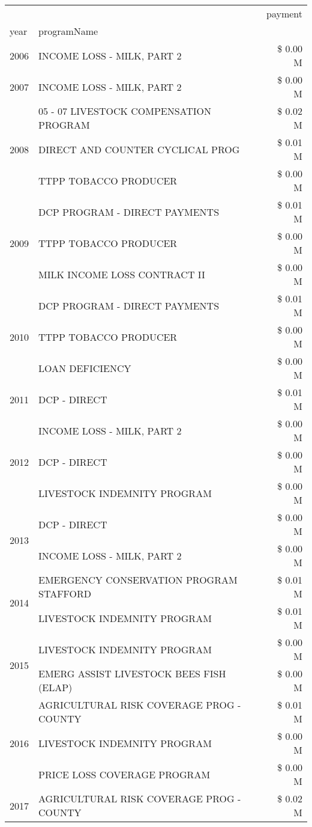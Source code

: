\begin{tabular}{llr}
\toprule
 &  & payment \\
year & programName &  \\
\midrule
2006 & INCOME LOSS - MILK, PART 2 & \$ 0.00 M \\
\cline{1-3}
2007 & INCOME LOSS - MILK, PART 2 & \$ 0.00 M \\
\cline{1-3}
\multirow[t]{3}{*}{2008} & 05 - 07 LIVESTOCK COMPENSATION PROGRAM & \$ 0.02 M \\
 & DIRECT AND COUNTER CYCLICAL PROG & \$ 0.01 M \\
 & TTPP TOBACCO PRODUCER & \$ 0.00 M \\
\cline{1-3}
\multirow[t]{3}{*}{2009} & DCP PROGRAM - DIRECT PAYMENTS & \$ 0.01 M \\
 & TTPP TOBACCO PRODUCER & \$ 0.00 M \\
 & MILK INCOME LOSS CONTRACT II & \$ 0.00 M \\
\cline{1-3}
\multirow[t]{3}{*}{2010} & DCP PROGRAM - DIRECT PAYMENTS & \$ 0.01 M \\
 & TTPP TOBACCO PRODUCER & \$ 0.00 M \\
 & LOAN DEFICIENCY & \$ 0.00 M \\
\cline{1-3}
2011 & DCP - DIRECT & \$ 0.01 M \\
\cline{1-3}
\multirow[t]{3}{*}{2012} & INCOME LOSS - MILK, PART 2 & \$ 0.00 M \\
 & DCP - DIRECT & \$ 0.00 M \\
 & LIVESTOCK INDEMNITY PROGRAM & \$ 0.00 M \\
\cline{1-3}
\multirow[t]{2}{*}{2013} & DCP - DIRECT & \$ 0.00 M \\
 & INCOME LOSS - MILK, PART 2 & \$ 0.00 M \\
\cline{1-3}
\multirow[t]{2}{*}{2014} & EMERGENCY CONSERVATION PROGRAM STAFFORD & \$ 0.01 M \\
 & LIVESTOCK INDEMNITY PROGRAM & \$ 0.01 M \\
\cline{1-3}
\multirow[t]{2}{*}{2015} & LIVESTOCK INDEMNITY PROGRAM & \$ 0.00 M \\
 & EMERG ASSIST LIVESTOCK BEES FISH (ELAP) & \$ 0.00 M \\
\cline{1-3}
\multirow[t]{3}{*}{2016} & AGRICULTURAL RISK COVERAGE PROG - COUNTY & \$ 0.01 M \\
 & LIVESTOCK INDEMNITY PROGRAM & \$ 0.00 M \\
 & PRICE LOSS COVERAGE PROGRAM & \$ 0.00 M \\
\cline{1-3}
\multirow[t]{3}{*}{2017} & AGRICULTURAL RISK COVERAGE PROG - COUNTY & \$ 0.02 M \\

\end{tabular}
